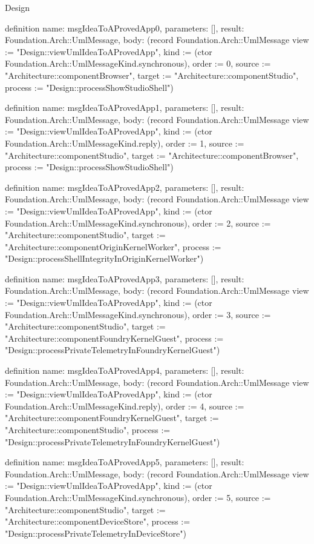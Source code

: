 \begin{lexlean}{Design}
\begin{semanticmodule}
definition{
  name: msgIdeaToAProvedApp0,
  parameters: [],
  result: Foundation.Arch::UmlMessage,
  body: (record Foundation.Arch::UmlMessage {view := "Design::viewUmlIdeaToAProvedApp", kind := (ctor Foundation.Arch::UmlMessageKind.synchronous), order := 0, source := "Architecture::componentBrowser", target := "Architecture::componentStudio", process := "Design::processShowStudioShell"})
}

definition{
  name: msgIdeaToAProvedApp1,
  parameters: [],
  result: Foundation.Arch::UmlMessage,
  body: (record Foundation.Arch::UmlMessage {view := "Design::viewUmlIdeaToAProvedApp", kind := (ctor Foundation.Arch::UmlMessageKind.reply), order := 1, source := "Architecture::componentStudio", target := "Architecture::componentBrowser", process := "Design::processShowStudioShell"})
}

definition{
  name: msgIdeaToAProvedApp2,
  parameters: [],
  result: Foundation.Arch::UmlMessage,
  body: (record Foundation.Arch::UmlMessage {view := "Design::viewUmlIdeaToAProvedApp", kind := (ctor Foundation.Arch::UmlMessageKind.synchronous), order := 2, source := "Architecture::componentStudio", target := "Architecture::componentOriginKernelWorker", process := "Design::processShellIntegrityInOriginKernelWorker"})
}

definition{
  name: msgIdeaToAProvedApp3,
  parameters: [],
  result: Foundation.Arch::UmlMessage,
  body: (record Foundation.Arch::UmlMessage {view := "Design::viewUmlIdeaToAProvedApp", kind := (ctor Foundation.Arch::UmlMessageKind.synchronous), order := 3, source := "Architecture::componentStudio", target := "Architecture::componentFoundryKernelGuest", process := "Design::processPrivateTelemetryInFoundryKernelGuest"})
}

definition{
  name: msgIdeaToAProvedApp4,
  parameters: [],
  result: Foundation.Arch::UmlMessage,
  body: (record Foundation.Arch::UmlMessage {view := "Design::viewUmlIdeaToAProvedApp", kind := (ctor Foundation.Arch::UmlMessageKind.reply), order := 4, source := "Architecture::componentFoundryKernelGuest", target := "Architecture::componentStudio", process := "Design::processPrivateTelemetryInFoundryKernelGuest"})
}

definition{
  name: msgIdeaToAProvedApp5,
  parameters: [],
  result: Foundation.Arch::UmlMessage,
  body: (record Foundation.Arch::UmlMessage {view := "Design::viewUmlIdeaToAProvedApp", kind := (ctor Foundation.Arch::UmlMessageKind.synchronous), order := 5, source := "Architecture::componentStudio", target := "Architecture::componentDeviceStore", process := "Design::processPrivateTelemetryInDeviceStore"})
}


\end{semanticmodule}
\end{lexlean}
